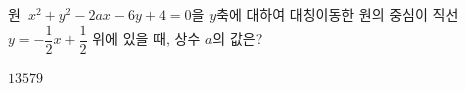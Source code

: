 원~$x^2+y^2-2ax-6y+4=0$을 $y$축에 대하여 대칭이동한 원의 중심이 직선~$y=-\dfrac{1}{2}x+\dfrac{1}{2}$ 위에 있을 때, 상수 $a$의 값은?
\begin{choices32}{$1$}{$3$}{$5$}{$7$}{$9$}\end{choices32}
